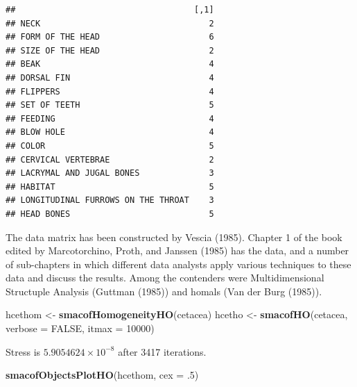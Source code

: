 \documentclass[
  12pt,
]{article}
\newenvironment{Shaded}{\begin{snugshade}}{\end{snugshade}}
\newcommand{\AttributeTok}[1]{\textcolor[rgb]{0.13,0.29,0.53}{#1}}
\newcommand{\ConstantTok}[1]{\textcolor[rgb]{0.56,0.35,0.01}{#1}}
\newcommand{\DecValTok}[1]{\textcolor[rgb]{0.00,0.00,0.81}{#1}}
\newcommand{\FunctionTok}[1]{\textcolor[rgb]{0.13,0.29,0.53}{\textbf{#1}}}
\newcommand{\NormalTok}[1]{#1}
\newcommand{\OtherTok}[1]{\textcolor[rgb]{0.56,0.35,0.01}{#1}}
\begin{document}
\begin{verbatim}
##                                    [,1]
## NECK                                  2
## FORM OF THE HEAD                      6
## SIZE OF THE HEAD                      2
## BEAK                                  4
## DORSAL FIN                            4
## FLIPPERS                              4
## SET OF TEETH                          5
## FEEDING                               4
## BLOW HOLE                             4
## COLOR                                 5
## CERVICAL VERTEBRAE                    2
## LACRYMAL AND JUGAL BONES              3
## HABITAT                               5
## LONGITUDINAL FURROWS ON THE THROAT    3
## HEAD BONES                            5
\end{verbatim}

The data matrix has been constructed by Vescia (1985). Chapter 1 of the
book edited by Marcotorchino, Proth, and Janssen (1985) has the data, and a number of sub-chapters in which different data analysts
apply various techniques to these data and discuss the results. Among the contenders were Multidimensional Structuple Analysis (Guttman (1985))
and homals (Van der Burg (1985)).

\begin{Shaded}
\begin{Highlighting}[]
\NormalTok{hcethom }\OtherTok{\textless{}{-}} \FunctionTok{smacofHomogeneityHO}\NormalTok{(cetacea)}
\NormalTok{hcetho }\OtherTok{\textless{}{-}} \FunctionTok{smacofHO}\NormalTok{(cetacea, }\AttributeTok{verbose =} \ConstantTok{FALSE}\NormalTok{, }\AttributeTok{itmax =} \DecValTok{10000}\NormalTok{)}
\end{Highlighting}
\end{Shaded}

Stress is \ensuremath{5.9054624\times 10^{-8}} after 3417 iterations.

\begin{Shaded}
\begin{Highlighting}[]
\FunctionTok{smacofObjectsPlotHO}\NormalTok{(hcethom, }\AttributeTok{cex =}\NormalTok{ .}\DecValTok{5}\NormalTok{)}
\end{Highlighting}
\end{Shaded}
\end{document}
